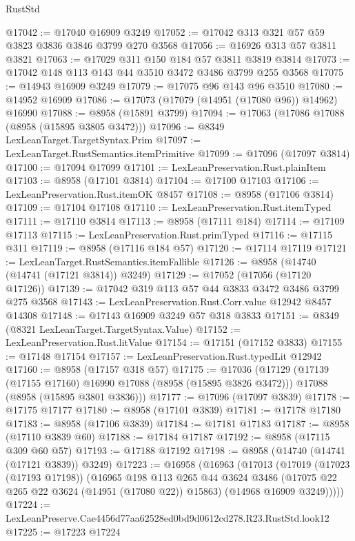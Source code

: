 \begin{lexlean}{RustStd}
\begin{coremodule}
@17042 := @17040 @16909 @3249
@17052 := @17042 @313 @321 @57 @59 @3823 @3836 @3846 @3799 @270 @3568
@17056 := @16926 @313 @57 @3811 @3821
@17063 := @17029 @311 @150 @184 @57 @3811 @3819 @3814
@17073 := @17042 @148 @113 @143 @44 @3510 @3472 @3486 @3799 @255 @3568
@17075 := @14943 @16909 @3249
@17079 := @17075 @96 @143 @96 @3510
@17080 := @14952 @16909
@17086 := @17073 (@17079 (@14951 (@17080 @96)) @14962) @16990
@17088 := @8958 (@15891 @3799)
@17094 := @17063 (@17086 @17088 (@8958 (@15895 @3805 @3472)))
@17096 := @8349 LexLeanTarget.TargetSyntax.Prim
@17097 := LexLeanTarget.RustSemantics.itemPrimitive
@17099 := @17096 (@17097 @3814)
@17100 := @17094 @17099
@17101 := LexLeanPreservation.Rust.plainItem
@17103 := @8958 (@17101 @3814)
@17104 := @17100 @17103
@17106 := LexLeanPreservation.Rust.itemOK @8457
@17108 := @8958 (@17106 @3814)
@17109 := @17104 @17108
@17110 := LexLeanPreservation.Rust.itemTyped
@17111 := @17110 @3814
@17113 := @8958 (@17111 @184)
@17114 := @17109 @17113
@17115 := LexLeanPreservation.Rust.primTyped
@17116 := @17115 @311
@17119 := @8958 (@17116 @184 @57)
@17120 := @17114 @17119
@17121 := LexLeanTarget.RustSemantics.itemFallible
@17126 := @8958 (@14740 (@14741 (@17121 @3814)) @3249)
@17129 := @17052 (@17056 (@17120 @17126))
@17139 := @17042 @319 @113 @57 @44 @3833 @3472 @3486 @3799 @275 @3568
@17143 := LexLeanPreservation.Rust.Corr.value @12942 @8457 @14308
@17148 := @17143 @16909 @3249 @57 @318 @3833
@17151 := @8349 (@8321 LexLeanTarget.TargetSyntax.Value)
@17152 := LexLeanPreservation.Rust.litValue
@17154 := @17151 (@17152 @3833)
@17155 := @17148 @17154
@17157 := LexLeanPreservation.Rust.typedLit @12942
@17160 := @8958 (@17157 @318 @57)
@17175 := @17036
    (@17129
      (@17139 (@17155 @17160) @16990 @17088 (@8958 (@15895 @3826 @3472)))
      @17088
      (@8958 (@15895 @3801 @3836)))
@17177 := @17096 (@17097 @3839)
@17178 := @17175 @17177
@17180 := @8958 (@17101 @3839)
@17181 := @17178 @17180
@17183 := @8958 (@17106 @3839)
@17184 := @17181 @17183
@17187 := @8958 (@17110 @3839 @60)
@17188 := @17184 @17187
@17192 := @8958 (@17115 @309 @60 @57)
@17193 := @17188 @17192
@17198 := @8958 (@14740 (@14741 (@17121 @3839)) @3249)
@17223 := @16958
    (@16963
      (@17013
        (@17019
          (@17023 (@17193 @17198))
          (@16965
            @198
            @113
            @265
            @44
            @3624
            @3486
            (@17075 @22 @265 @22 @3624 (@14951 (@17080 @22)) @15863)
            (@14968 @16909 @3249)))))
@17224 := LexLeanPreserve.Cae4456d77aa62528ed0bd9d0612cd278.R23.RustStd.look12
@17225 := @17223 @17224

\end{coremodule}
\end{lexlean}
